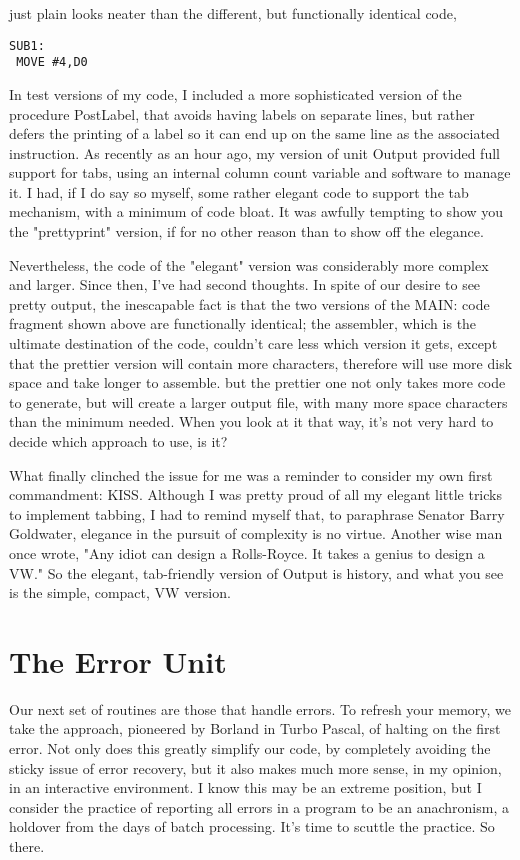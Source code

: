 just plain looks neater than the different, but functionally identical code,

\begin{verbatim}
SUB1:
 MOVE #4,D0
\end{verbatim}

In test versions of my code, I included a more sophisticated version of the procedure PostLabel, that avoids having labels on separate lines, but rather defers the printing of a label so it can end up on the same line as the associated instruction. As recently as an hour ago, my version of unit Output provided full support for tabs, using an internal column count variable and software to manage it. I had, if I do say so myself, some rather elegant code to support the tab mechanism, with a minimum of code bloat. It was awfully tempting to show you the "prettyprint" version, if for no other reason than to show off the elegance.

Nevertheless, the code of the "elegant" version was considerably more complex and larger. Since then, I've had second thoughts. In spite of our desire to see pretty output, the inescapable fact is that the two versions of the MAIN: code fragment shown above are functionally identical; the assembler, which is the ultimate destination of the code, couldn't care less which version it gets, except that the prettier version will contain more characters, therefore will use more disk space and take longer to assemble. but the prettier one not only takes more code to generate, but will create a larger output file, with many more space characters than the minimum needed. When you look at it that way, it's not very hard to decide which approach to use, is it?

What finally clinched the issue for me was a reminder to consider my own first commandment: KISS. Although I was pretty proud of all my elegant little tricks to implement tabbing, I had to remind myself that, to paraphrase Senator Barry Goldwater, elegance in the pursuit of complexity is no virtue. Another wise man once wrote, "Any idiot can design a Rolls-Royce. It takes a genius to design a VW."  So the elegant, tab-friendly version of Output is history, and what you see is the simple, compact, VW version.

\section{The Error Unit}

Our next set of routines are those that handle errors. To refresh your memory, we take the approach, pioneered by Borland in Turbo Pascal, of halting on the first error. Not only does this greatly simplify our code, by completely avoiding the sticky issue of error recovery, but it also makes much more sense, in my opinion, in an interactive environment. I know this may be an extreme position, but I consider the practice of reporting all errors in a program to be an anachronism, a holdover from the days of batch processing. It's time to scuttle the practice. So there.

